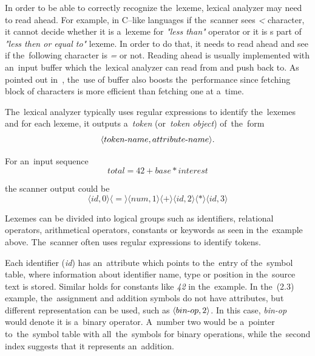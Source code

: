 \documentclass[
  digital, %
  table,   %
  lof,     %
  lot,     %
  oneside,
]{fithesis3}
\begin{document}
In order to be able to correctly recognize the~lexeme, lexical analyzer may need to read ahead. For example, in C--like languages if the~scanner sees \textit{<} character, it cannot decide whether it is a~lexeme for \textit{"less than"} operator or it is s part of \textit{"less then or equal to"} lexeme. In order to do that, it needs to read ahead and see if the~following character is \textit{=} or not. Reading ahead is usually implemented with an~input buffer which the~lexical analyzer can read from and push back to. As pointed out in~\cite{dragon-book}, the~use of buffer also boosts the~performance since fetching block of characters is more efficient than fetching one at a~time.

The~lexical analyzer typically uses regular expressions to identify the~lexemes and for each lexeme, it outputs a~\textit{token} (or~\textit{token object}) of~the~form 
\begin{equation}
  \langle token \textnormal{-} name, attribute \textnormal{-} name \rangle \textnormal{.}
\end{equation}

\noindent
For an~input sequence 
\begin{equation}
  total = 42 + base * interest
\end{equation}
 
the scanner output could be
\begin{equation}
  \langle id, 0 \rangle 
  \langle = \rangle 
  \langle num, 1 \rangle 
  \langle + \rangle 
  \langle id, 2 \rangle 
  \langle * \rangle 
  \langle id, 3 \rangle
\end{equation}

Lexemes can be divided into logical groups such as identifiers, relational operators, arithmetical operators, constants or keywords as seen in the~example above. The~scanner often uses regular expressions to identify tokens.

Each identifier (\textit{id}) has an~attribute which points to the~entry of the~symbol table, where information about identifier name, type or position in the~source text is stored. Similar holds for constants like \textit{42} in the~example. In the~(2.3) example, the~assignment and addition symbols do not have attributes, but different representation can be used, such as $ \langle bin \textnormal{-} op, 2 \rangle $. In this case, \textit{bin-op} would denote it is a~binary operator. A~number two would be a~pointer to~the~symbol table with all~the~symbols for binary operations, while the~second index suggests that it represents an~addition.
\end{document}
